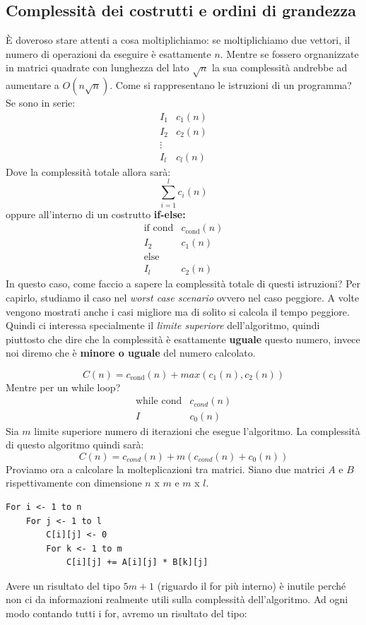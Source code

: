 \documentclass[a4paper]{article}
\begin{document}
\subsection{Complessità dei costrutti e ordini di grandezza}

È doveroso stare attenti a cosa moltiplichiamo: se moltiplichiamo due vettori, il numero di operazioni da eseguire è esattamente $n$. Mentre se fossero orgnanizzate in matrici quadrate con lunghezza del lato $\sqrt{n}$ la sua complessità andrebbe ad aumentare a $O(n\sqrt{n})$.
Come si rappresentano le istruzioni di un programma?
Se sono in serie:
\[\begin{matrix}
  I_1 & c_1(n)\\
  I_2 & c_2(n)\\
  \vdots\\
  I_l & c_l(n)
\end{matrix}\]
Dove la complessità totale allora sarà:
\[\sum_{i=1}^l c_i(n)\]
oppure all'interno di un costrutto \textbf{if-else:}
\[\begin{matrix}
  \text{if cond} & c_{\text{cond}}(n)\\
  I_2 & c_1(n)\\
  \text{else}\\
  I_l & c_2(n)
\end{matrix}\]
In questo caso, come faccio a sapere la complessità totale di questi istruzioni? Per capirlo, studiamo il caso nel \textit{worst case scenario} ovvero nel caso peggiore. A volte vengono mostrati anche i casi migliore ma di solito si calcola il tempo peggiore. Quindi ci interessa specialmente il \textit{limite superiore} dell'algoritmo, quindi piuttosto che dire che la complessità è esattamente \textbf{uguale} questo numero, invece noi diremo che è \textbf{minore o uguale} del numero calcolato.

\[C(n) = c_{\text{cond}}(n) + max(c_1(n), c_2(n))\]
Mentre per un while loop? 
\[\begin{matrix}
    \text{while cond} & c_{cond}(n)\\
    I & c_0(n)
\end{matrix}\]
Sia $m$ limite superiore numero di iterazioni che esegue l'algoritmo. La complessità di questo algoritmo quindi sarà:
\[C(n) = c_{cond}(n) + m(c_{cond}(n) + c_0(n))\]
Proviamo ora a calcolare la molteplicazioni tra matrici.
Siano due matrici $A$ e $B$ rispettivamente con dimensione $n$ x $m$ e $m$ x $l$.
\begin{lstlisting}
For i <- 1 to n
    For j <- 1 to l
        C[i][j] <- 0
        For k <- 1 to m
            C[i][j] += A[i][j] * B[k][j]
\end{lstlisting}
Avere un risultato del tipo $5m + 1$ (riguardo il for più interno) è inutile perché non ci da informazioni realmente utili sulla complessità dell'algoritmo. 
Ad ogni modo contando tutti i for, avremo un risultato del tipo:
\end{document}
